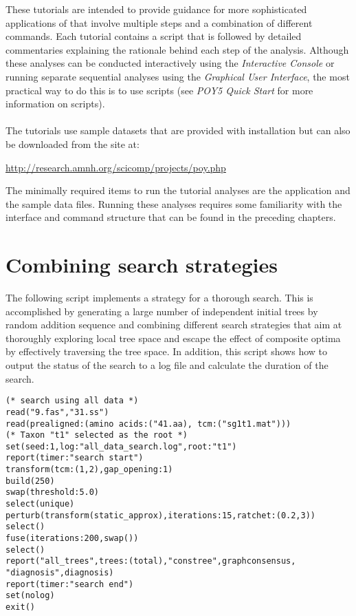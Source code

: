 These tutorials are intended to provide guidance for more sophisticated applications of \poy that involve 
multiple steps and a combination of different commands. Each tutorial contains a \poy script that is followed 
by detailed commentaries explaining the rationale behind each step of the analysis. Although these analyses 
can be conducted interactively using the \emph{Interactive Console} or running separate sequential analyses
 using the \emph{Graphical User Interface}, the most practical way to do this is to use \poy scripts (see 
 \emph{ POY5 Quick Start} for more information on \poy scripts).\\
\\
\indent The tutorials use sample datasets that are provided with \poy installation but can also be downloaded from 
the \poy site at:
\begin{center}
\url{http://research.amnh.org/scicomp/projects/poy.php}
\end{center}
The minimally required items to run the tutorial analyses are the \poy application and the sample data files. 
Running these analyses requires some familiarity with the \poy interface and command structure that can be 
found in the preceding chapters.


\section{Combining  search strategies}{\label{tutorial1}}
The following script implements a strategy for a thorough search. This is accomplished by generating a large 
number of independent initial trees by random addition sequence and combining different search strategies 
that aim at thoroughly exploring local tree space and escape the effect of composite optima by effectively 
traversing the tree space. In addition, this script shows how to output the status of the search to a log file and
 calculate the duration of the search. 

\begin{verbatim}
(* search using all data *)
read("9.fas","31.ss")
read(prealigned:(amino acids:("41.aa), tcm:("sg1t1.mat")))
(* Taxon "t1" selected as the root *)
set(seed:1,log:"all_data_search.log",root:"t1")
report(timer:"search start")
transform(tcm:(1,2),gap_opening:1)
build(250)
swap(threshold:5.0)
select(unique)
perturb(transform(static_approx),iterations:15,ratchet:(0.2,3))
select()
fuse(iterations:200,swap())
select()
report("all_trees",trees:(total),"constree",graphconsensus,
"diagnosis",diagnosis)
report(timer:"search end")
set(nolog)
exit()
\end{verbatim}

